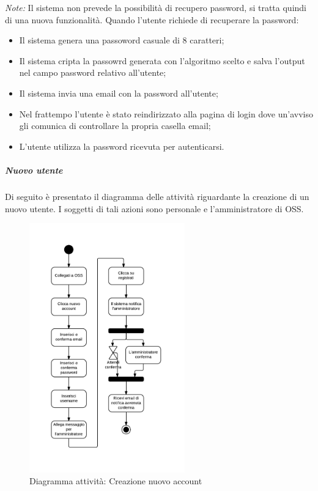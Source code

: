 \textit{Note:}
Il sistema non prevede la possibilità di recupero password, si tratta quindi di una nuova funzionalità. Quando l'utente richiede di recuperare la password:
\begin{itemize}
\item Il sistema genera una passoword casuale di 8 caratteri;
\item Il sistema cripta la passowrd generata con l'algoritmo scelto e salva l'output nel campo password relativo all'utente;
\item Il sistema invia una email con la password all'utente;
\item Nel frattempo l'utente è stato reindirizzato alla pagina di login dove un'avviso gli comunica di controllare la propria casella email;
\item L'utente utilizza la password ricevuta per autenticarsi.
\end{itemize} 


\subparagraph{Nuovo utente}
Di seguito è presentato il diagramma delle attività riguardante la creazione di un nuovo utente. I soggetti di tali azioni sono personale e l'amministratore di OSS.\\

\begin{figure}[H]
\centering
\includegraphics[width=0.6\textwidth]{images/user_new_user.png}
\caption{Diagramma attività: Creazione nuovo account}
\end{figure}


